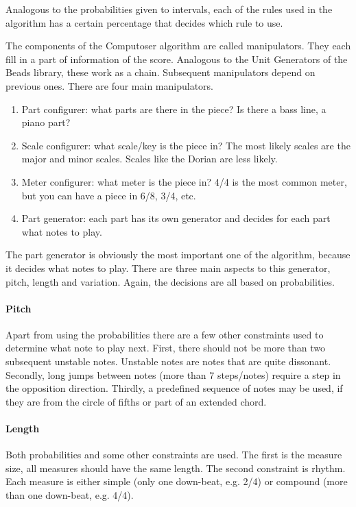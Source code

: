\documentclass[12pt]{article}
\begin{document}
Analogous to the probabilities given to intervals, each of the rules used in the algorithm has a certain percentage that decides which rule to use.
\newline

The components of the Computoser algorithm are called manipulators. They each fill in a part of information of the score. Analogous to the Unit Generators of the Beads library, these work as a chain. Subsequent manipulators depend on previous ones. There are four main manipulators.
\newline

\begin{enumerate}
\item Part configurer: what parts are there in the piece? Is there a bass line, a piano part?
\item Scale configurer: what scale/key is the piece in? The most likely scales are the major and minor scales. Scales like the Dorian are less likely.
\item Meter configurer: what meter is the piece in? 4/4 is the most common meter, but you can have a piece in 6/8, 3/4, etc.
\item Part generator: each part has its own generator and decides for each part what notes to play.
\end{enumerate}
 
The part generator is obviously the most important one of the algorithm, because it decides what notes to play. There are three main aspects to this generator, pitch, length and variation. Again, the decisions are all based on probabilities.

\paragraph{Pitch} Apart from using the probabilities there are a few other constraints used to determine what note to play next. First, there should not be more than two subsequent unstable notes. Unstable notes are notes that are quite dissonant. Secondly, long jumps between notes (more than 7 steps/notes) require a step in the opposition direction. Thirdly, a predefined sequence of notes may be used, if they are from the circle of fifths or part of an extended chord.

\paragraph{Length} Both probabilities and some other constraints are used. The first is the measure size, all measures should have the same length. The second constraint is rhythm. Each measure is either simple (only one down-beat, e.g. 2/4) or compound (more than one down-beat, e.g. 4/4).
\end{document}
